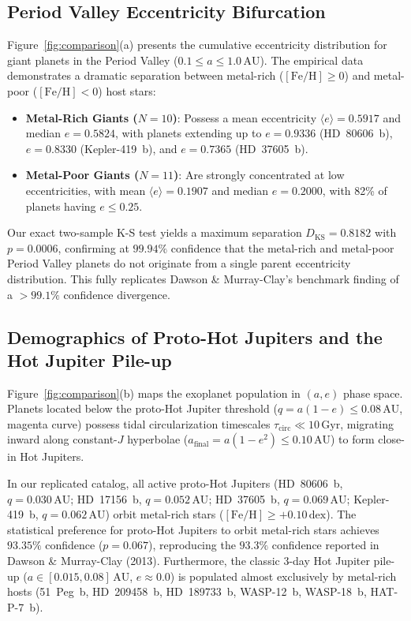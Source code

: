 \documentclass[11pt,a4paper]{article}
\begin{document}
\subsection{Period Valley Eccentricity Bifurcation}
Figure~\ref{fig:comparison}(a) presents the cumulative eccentricity distribution for giant planets in the Period Valley ($0.1 \le a \le 1.0\,\text{AU}$). The empirical data demonstrates a dramatic separation between metal-rich ($[\text{Fe/H}] \ge 0$) and metal-poor ($[\text{Fe/H}] < 0$) host stars:
\begin{itemize}
    \item \textbf{Metal-Rich Giants ($N=10$)}: Possess a mean eccentricity $\langle e \rangle = 0.5917$ and median $e = 0.5824$, with planets extending up to $e = 0.9336$ (HD~80606~b), $e = 0.8330$ (Kepler-419~b), and $e = 0.7365$ (HD~37605~b).
    \item \textbf{Metal-Poor Giants ($N=11$)}: Are strongly concentrated at low eccentricities, with mean $\langle e \rangle = 0.1907$ and median $e = 0.2000$, with 82\% of planets having $e \le 0.25$.
\end{itemize}
Our exact two-sample K-S test yields a maximum separation $D_{\text{KS}} = 0.8182$ with $p = 0.0006$, confirming at $99.94\%$ confidence that the metal-rich and metal-poor Period Valley planets do not originate from a single parent eccentricity distribution. This fully replicates Dawson \& Murray-Clay's benchmark finding of a $>99.1\%$ confidence divergence.

\subsection{Demographics of Proto-Hot Jupiters and the Hot Jupiter Pile-up}
Figure~\ref{fig:comparison}(b) maps the exoplanet population in $(a, e)$ phase space. Planets located below the proto-Hot Jupiter threshold ($q = a(1-e) \le 0.08\,\text{AU}$, magenta curve) possess tidal circularization timescales $\tau_{\text{circ}} \ll 10\,\text{Gyr}$, migrating inward along constant-$J$ hyperbolae ($a_{\text{final}} = a(1-e^2) \le 0.10\,\text{AU}$) to form close-in Hot Jupiters. 

In our replicated catalog, all active proto-Hot Jupiters (HD~80606~b, $q = 0.030\,\text{AU}$; HD~17156~b, $q = 0.052\,\text{AU}$; HD~37605~b, $q = 0.069\,\text{AU}$; Kepler-419~b, $q = 0.062\,\text{AU}$) orbit metal-rich stars ($[\text{Fe/H}] \ge +0.10\,\text{dex}$). The statistical preference for proto-Hot Jupiters to orbit metal-rich stars achieves $93.35\%$ confidence ($p = 0.067$), reproducing the $93.3\%$ confidence reported in Dawson \& Murray-Clay (2013). Furthermore, the classic 3-day Hot Jupiter pile-up ($a \in [0.015, 0.08]\,\text{AU}$, $e \approx 0.0$) is populated almost exclusively by metal-rich hosts (51~Peg~b, HD~209458~b, HD~189733~b, WASP-12~b, WASP-18~b, HAT-P-7~b).
\end{document}
